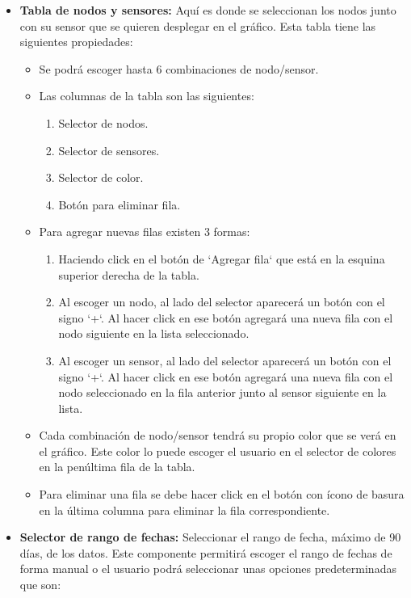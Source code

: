 \begin{itemize}
    \item \textbf{Tabla de nodos y sensores:} Aquí es donde se seleccionan los nodos junto con su sensor que se quieren desplegar en el gráfico. Esta tabla tiene las siguientes propiedades:
          \begin{itemize}
              \item Se podrá escoger hasta 6 combinaciones de nodo/sensor.
              \item Las columnas de la tabla son las siguientes:
                    \begin{enumerate}
                        \item Selector de nodos.
                        \item Selector de sensores.
                        \item Selector de color.
                        \item Botón para eliminar fila.
                    \end{enumerate}
              \item Para agregar nuevas filas existen 3 formas:
                    \begin{enumerate}
                        \item Haciendo click en el botón de `Agregar fila` que está en la esquina superior derecha de la tabla.
                        \item Al escoger un nodo, al lado del selector aparecerá un botón con el signo `+`. Al hacer click en ese botón agregará una nueva fila con el nodo siguiente en la lista seleccionado.
                        \item Al escoger un sensor, al lado del selector aparecerá un botón con el signo `+`. Al hacer click en ese botón agregará una nueva fila con el nodo seleccionado en la fila anterior junto al sensor siguiente en la lista.
                    \end{enumerate}
              \item Cada combinación de nodo/sensor tendrá su propio color que se verá en el gráfico. Este color lo puede escoger el usuario en el selector de colores en la penúltima fila de la tabla.
              \item Para eliminar una fila se debe hacer click en el botón con ícono de basura en la última columna para eliminar la fila correspondiente.
          \end{itemize}
    \item \textbf{Selector de rango de fechas:} Seleccionar el rango de fecha, máximo de 90 días, de los datos. Este componente permitirá escoger el rango de fechas de forma manual o el usuario podrá seleccionar unas opciones predeterminadas que son:

\end{itemize}
